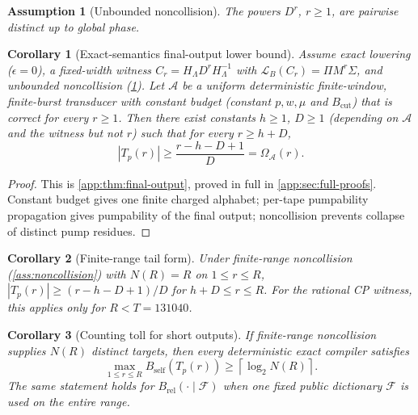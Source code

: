 \documentclass[a4paper,twocolumn,10pt,unpublished]{quantumarticle}
\newtheorem{corollary}{Corollary}
\newtheorem{assumption}{Assumption}
\begin{document}
\begin{assumption}[Unbounded noncollision]
\label{ass:unbounded-noncollision}
The powers $D^r$, $r \geq 1$, are pairwise distinct up to global phase.
\end{assumption}

\begin{corollary}[Exact-semantics final-output lower bound]
\label{cor:exact-semantics-corollary}
\label{thm:final-output}
Assume exact lowering ($\epsilon = 0$), a fixed-width witness
$C_r = H_\Lambda D^r H_\Lambda^{-1}$ with
$\mathcal{L}_B(C_r) = \Pi M^r \Sigma$, and unbounded noncollision
(\cref{ass:unbounded-noncollision}). Let $\mathcal{A}$ be a uniform
deterministic finite-window, finite-burst transducer with constant budget
(constant $p,w,\mu$ and $B_{\mathrm{cut}}$) that is correct for every
$r \geq 1$. Then there exist constants
$h \geq 1$, $D \geq 1$ (depending on $\mathcal{A}$ and the witness but not
$r$) such that for every $r \geq h + D$,
\begin{equation}\label{eq:exact-output-bound}
  |T_p(r)| \geq \frac{r-h-D+1}{D} = \Omega_{\mathcal{A}}(r).
\end{equation}
\end{corollary}

\begin{proof}
This is \cref{app:thm:final-output}, proved in full in
\cref{app:sec:full-proofs}. Constant budget gives one finite
charged alphabet; per-tape pumpability propagation gives pumpability of the
final output; noncollision prevents collapse of distinct pump residues.
\end{proof}

\begin{corollary}[Finite-range tail form]
\label{cor:finite-tail}
Under finite-range noncollision (\cref{ass:noncollision}) with $N(R)=R$ on
$1 \leq r \leq R$, $|T_p(r)| \geq (r-h-D+1)/D$ for $h+D \leq r \leq R$.
For the rational CP witness, this applies only for $R < T = 131040$.
\end{corollary}

\begin{corollary}[Counting toll for short outputs]
\label{cor:counting-toll}
If finite-range noncollision supplies $N(R)$ distinct targets, then every
deterministic exact compiler satisfies
\begin{equation*}
 \max_{1\leq r\leq R}B_{\mathrm{self}}(T_p(r))
 \geq \left\lceil\log_2N(R)\right\rceil.
\end{equation*}
The same statement holds for $B_{\mathrm{rel}}(\cdot\mid\mathcal F)$
when one fixed public dictionary $\mathcal F$ is used on the entire range.
\end{corollary}
\end{document}
